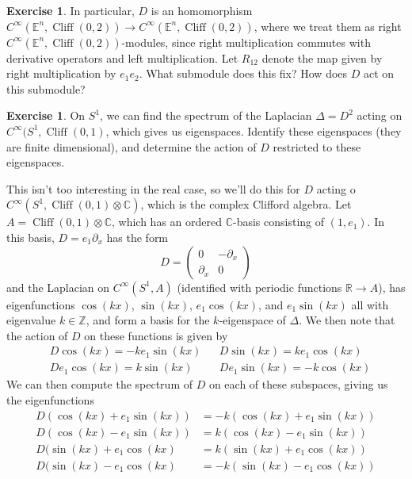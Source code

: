 \documentclass[psamsfonts]{amsart}
\theoremstyle{definition}
\newtheorem{exer}[thm]{Exercise}
\theoremstyle{remark}
\newcommand{\R}{\mathbb{R}}
\newcommand{\Z}{\mathbb{Z}}
\newcommand{\E}{\mathbb{E}}
\newcommand{\C}{\mathbb{C}}
\DeclareMathOperator{\Cliff}{Cliff}
\begin{document}
%
\begin{exer}
In particular, $D$ is an homomorphism $C^\infty(\E^n, \Cliff(0,2)) \to C^\infty(\E^n, \Cliff(0,2))$, where we treat them as right $C^\infty(\E^n, \Cliff(0,2))$-modules, since right multiplication commutes with derivative operators and left multiplication. Let $R_{12}$ denote the map given by right multiplication by $e_1e_2$. What submodule does this fix? How does $D$ act on this submodule?
\end{exer}
%
\begin{exer}
On $S^1$, we can find the spectrum of the Laplacian $\Delta = D^2$ acting on $C^\infty(S^1, \Cliff(0,1)$, which gives us eigenspaces. Identify these eigenspaces (they are finite dimensional), and determine the action of $D$ restricted to these eigenspaces.
\end{exer}
This isn't too interesting in the real case, so we'll do this for $D$ acting o $C^\infty(S^1, \Cliff(0,1) \otimes \C)$, which is the complex Clifford algebra. Let $A = \Cliff(0,1) \otimes \C$, which has an ordered $\C$-basis consisting of $(1,e_1)$. In this basis, $D = e_1 \partial_x$ has the form
$$D = \begin{pmatrix}
0 & -\partial_x \\
\partial_x & 0
\end{pmatrix} $$
and the Laplacian on $C^\infty(S^1, A)$ (identified with periodic functions $\R \to A$), has eigenfunctions $\cos(kx)$, $\sin(kx)$, $e_1\cos(kx)$, and  $e_1\sin(kx)$ all with eigenvalue $k \in \Z$, and form a basis for the $k$-eigenspace of $\Delta$. We then note that the action of $D$ on these functions is given by
\begin{align*}
&D\cos(kx) = -ke_1\sin(kx) &&D\sin(kx) = ke_1\cos(kx) \\
&De_1\cos(kx) = k\sin(kx) &&De_1\sin(kx) = -k\cos(kx)
\end{align*}
We can then compute the spectrum of $D$ on each of these subspaces, giving us the eigenfunctions
\begin{align*}
D(\cos(kx) + e_1\sin(kx)) &= -k(\cos(kx) + e_1\sin(kx)) \\
D(\cos(kx) - e_1\sin(kx)) &= k(\cos(kx) - e_1\sin(kx)) \\
D(\sin(kx) + e_1\cos(kx) &= k(\sin(kx) + e_1\cos(kx)) \\
D(\sin(kx) - e_1\cos(kx) &= -k(\sin(kx) - e_1\cos(kx))
\end{align*}
%
\end{document}
